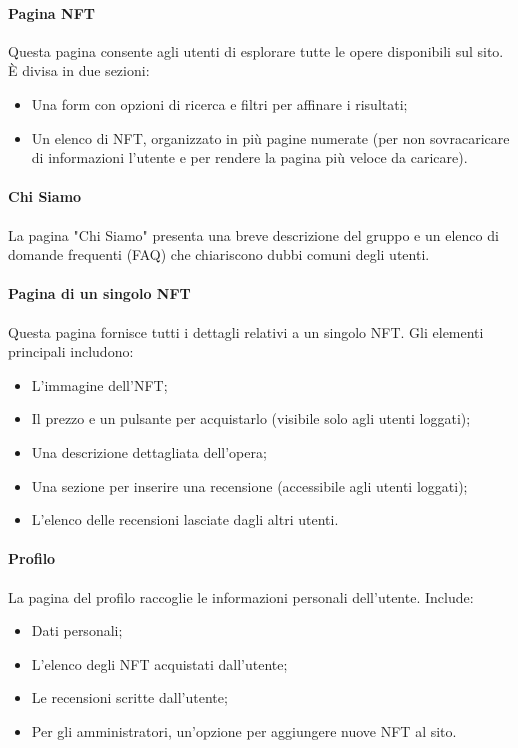 \documentclass[10pt]{article}
\begin{document}
\paragraph{Pagina NFT} Questa pagina consente agli utenti di esplorare tutte le opere disponibili sul sito. È divisa in due sezioni: \begin{itemize} \item Una form con opzioni di ricerca e filtri per affinare i risultati; \item Un elenco di NFT, organizzato in più pagine numerate (per non sovracaricare di informazioni l'utente e per rendere la pagina più veloce da caricare). \end{itemize}

\paragraph{Chi Siamo} La pagina "Chi Siamo" presenta una breve descrizione del gruppo e un elenco di domande frequenti (FAQ) che chiariscono dubbi comuni degli utenti.

\paragraph{Pagina di un singolo NFT} Questa pagina fornisce tutti i dettagli relativi a un singolo NFT. Gli elementi principali includono: \begin{itemize} \item L’immagine dell’NFT; \item Il prezzo e un pulsante per acquistarlo (visibile solo agli utenti loggati); \item Una descrizione dettagliata dell’opera; \item Una sezione per inserire una recensione (accessibile agli utenti loggati); \item L’elenco delle recensioni lasciate dagli altri utenti. \end{itemize}

\paragraph{Profilo} La pagina del profilo raccoglie le informazioni personali dell’utente. Include: \begin{itemize} \item Dati personali; \item L’elenco degli NFT acquistati dall’utente; \item Le recensioni scritte dall’utente; \item Per gli amministratori, un’opzione per aggiungere nuove NFT al sito. \end{itemize}
\end{document}
